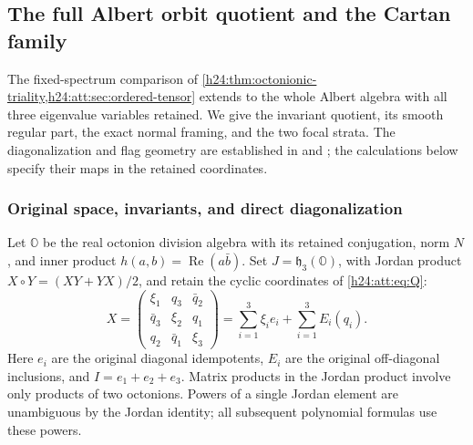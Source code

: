 \subsection{The full Albert orbit quotient and the Cartan family}
\label{h24:ocb:sec:full-family}

The fixed-spectrum comparison of
\cref{h24:thm:octonionic-triality,h24:att:sec:ordered-tensor} extends to the
whole Albert algebra with all three eigenvalue variables retained.
We give the invariant quotient, its smooth regular part, the exact
normal framing, and the two focal strata. The diagonalization and flag
geometry are established in \cite[Proposition~2.8.2 and
Theorems~2.7.4, 2.8.3]{h24:Yokota2009} and
\cite[Definition~2.2 and Sections~2.3--2.6]{h24:MareWillems2013}; the
calculations below specify their maps in the retained coordinates.

\subsubsection{Original space, invariants, and direct diagonalization}
\label{h24:ocb:sec:diagonalization}

Let $\mathbb O$ be the real octonion division algebra with its retained
conjugation, norm $N$, and inner product
$h(a,b)=\operatorname{Re}(a\bar b)$. Set
$J=\mathfrak h_3(\mathbb O)$, with Jordan product
$X\circ Y=(XY+YX)/2$, and retain the cyclic coordinates of
\eqref{h24:att:eq:Q}:
\begin{equation}
 X=\begin{pmatrix}\xi_1&q_3&\bar q_2\\
 \bar q_3&\xi_2&q_1\\q_2&\bar q_1&\xi_3\end{pmatrix}
 =\sum_{i=1}^3\xi_i e_i+\sum_{i=1}^3E_i(q_i).
 \label{h24:ocb:eq:coordinates}\tag{OCB1}
\end{equation}
Here $e_i$ are the original diagonal idempotents, $E_i$ are the original
off-diagonal inclusions, and $I=e_1+e_2+e_3$. Matrix products in the
Jordan product involve only products of two octonions. Powers of a single
Jordan element are unambiguous by the Jordan identity; all subsequent
polynomial formulas use these powers.

